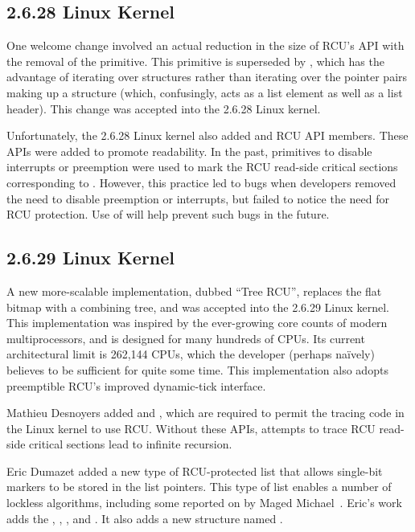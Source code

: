 \subsection{2.6.28 Linux Kernel}

One welcome change involved an actual reduction in the size of RCU's
API with the removal of the  primitive.
This primitive is superseded by ,
which has the advantage of iterating over structures rather than
iterating over the pointer pairs making up a 
structure (which, confusingly, acts as a list element as well
as a list header).
This change was accepted into the 2.6.28 Linux kernel.

Unfortunately, the 2.6.28 Linux kernel also added
 and
 RCU API members.
These APIs were added to promote readability.
In the past, primitives to disable interrupts or preemption were used
to mark the RCU read-side critical sections corresponding to
.
However, this practice led to bugs when developers removed the need
to disable preemption or interrupts, but failed to notice the need
for RCU protection.
Use of  will help prevent such bugs in the
future.

\subsection{2.6.29 Linux Kernel}

A new more-scalable implementation, dubbed ``Tree RCU'', replaces
the flat bitmap with a combining tree, and was accepted into the 2.6.29
Linux kernel.
This implementation was inspired by the ever-growing core counts of
modern multiprocessors, and is designed for many hundreds of CPUs.
Its current architectural limit is 262,144 CPUs, which the developer
(perhaps na\"ively) believes to be sufficient for quite some time.
This implementation also adopts preemptible RCU's improved dynamic-tick
interface.

Mathieu Desnoyers added
 and
,
which are required to permit the tracing code in the Linux kernel
to use RCU.
Without these APIs, attempts to trace RCU read-side critical sections
lead to infinite recursion.

Eric Dumazet added a new type of RCU-protected list that allows single-bit
markers to be stored in the list pointers.
This type of list enables a number of lockless algorithms, including
some reported on by Maged Michael~\cite{MagedMichael04a}.
Eric's work adds the ,
, , and
.
It also adds a new structure named .

